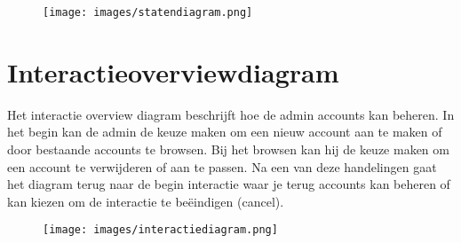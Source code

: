 \begin{figure}[H]
  \centering
  \texttt{[image: images/statendiagram.png]}
  \label{figure:statendiagram}
\end{figure}

\newpage

\section{Interactieoverviewdiagram}
\label{sec:interactieoverview}

Het interactie overview diagram beschrijft hoe de admin accounts kan beheren. 
In het begin kan de admin de keuze maken om een nieuw account aan te maken of 
door bestaande accounts te browsen. Bij het browsen kan hij de keuze maken om 
een account te verwijderen of aan te passen. Na een van deze handelingen gaat 
het diagram terug naar de begin interactie waar je terug accounts kan beheren 
of kan kiezen om de interactie te beëindigen (cancel).

\begin{figure}[H]
  \centering
  \texttt{[image: images/interactiediagram.png]}
  \label{figure:interactiediagram}
\end{figure}
